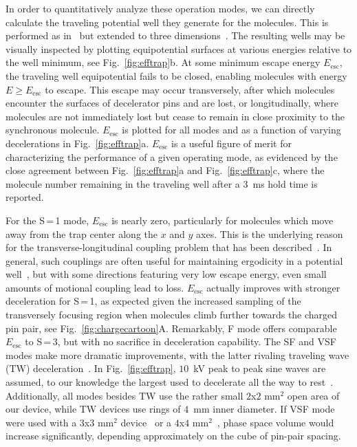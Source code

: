 \documentclass[%
 reprint,
 amsmath,amssymb,
 aps,
prl,
]{revtex4-1}
\begin{document}
In order to quantitatively analyze these operation modes, we can directly calculate the traveling potential well they generate for the molecules.
This is performed as in~\cite{Bethlem2000,Hudson2004} but extended to three dimensions~\cite{ssm}.
The resulting wells may be visually inspected by plotting equipotential surfaces at various energies relative to the well minimum, see Fig.~\ref{fig:efftrap}b.
At some minimum escape energy $E_\text{esc}$, the traveling well equipotential fails to be closed, enabling molecules with energy $E\ge E_\text{esc}$ to escape. 
This escape may occur transversely, after which molecules encounter the surfaces of decelerator pins and are lost, or longitudinally, where molecules are not immediately lost but cease to remain in close proximity to the synchronous molecule.
$E_\text{esc}$ is plotted for all modes and as a function of varying decelerations in Fig.~\ref{fig:efftrap}a.
$E_\text{esc}$ is a useful figure of merit for characterizing the performance of a given operating mode, as evidenced by the close agreement between Fig.~\ref{fig:efftrap}a and Fig.~\ref{fig:efftrap}c, where the molecule number remaining in the traveling well after a $3$~ms hold time is reported.

For the S\,=\,1 mode, $E_\text{esc}$ is nearly zero, particularly for molecules which move away from the trap center along the $x$ and $y$ axes. 
This is the underlying reason for the transverse-longitudinal coupling problem that has been described~\cite{VanDeMeerakker2006}.
In general, such couplings are often useful for maintaining ergodicity in a potential well~\cite{Surkov1996}, but with some directions featuring very low escape energy, even small amounts of motional coupling lead to loss.
$E_\text{esc}$ actually improves with stronger deceleration for S\,=\,1, as expected given the increased sampling of the transversely focusing region when molecules climb further towards the charged pin pair, see Fig.~\ref{fig:chargecartoon}A.
Remarkably, F mode offers comparable $E_\text{esc}$ to S\,=\,3, but with no sacrifice in deceleration capability.
The SF and VSF modes make more dramatic improvements, with the latter rivaling traveling wave (TW) deceleration~\cite{Osterwalder2010}. 
In Fig.~\ref{fig:efftrap}, $10$~kV peak to peak sine waves are assumed, to our knowledge the largest used to decelerate all the way to rest~\cite{Quintero-Perez2013}.
Additionally, all modes besides TW use the rather small $2$x$2\text{ mm}^2$ open area of our device, while TW devices use rings of $4$~mm inner diameter.
If VSF mode were used with a $3$x$3\text{ mm}^2$ device~\cite{Scharfenberg2009} or a $4$x$4\text{ mm}^2$~\cite{VandeMeerakker2005}, phase space volume would increase significantly, depending approximately on the cube of pin-pair spacing. 
\end{document}
